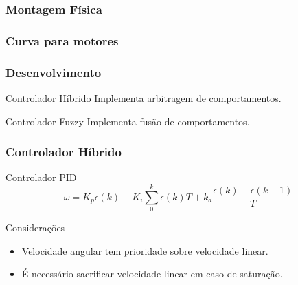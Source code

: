 \begin{frame}
	\frametitle{Montagem Física}
	
\end{frame}

\begin{frame}
	
\end{frame}

\begin{frame}
	\frametitle{Curva para motores}
	
\end{frame}

\begin{frame}
	
\end{frame}

\begin{frame}
	
\end{frame}
	
\begin{frame}
	\frametitle{Desenvolvimento}
	\begin{block}{Controlador Híbrido}
		Implementa arbitragem de comportamentos.
	\end{block}
	
	\begin{exampleblock}{Controlador Fuzzy}
		Implementa fusão de comportamentos.
	\end{exampleblock}
\end{frame}

\begin{frame}
	\frametitle{Controlador Híbrido}
	\begin{exampleblock}{Controlador PID}
		\begin{equation}
			\omega = K_p \epsilon(k) + K_i \sum_0^k \epsilon(k) T + k_d \frac{\epsilon(k) - \epsilon(k-1)}{T}
		\end{equation}
	\end{exampleblock}
	
	\begin{block}{Considerações}
		\begin{itemize}
		  \item Velocidade angular tem prioridade sobre velocidade linear.
		  \item É necessário sacrificar velocidade linear em caso de saturação.
		\end{itemize}
	\end{block}
\end{frame}
	
